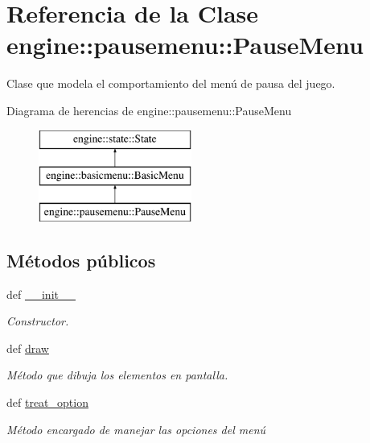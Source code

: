 \hypertarget{classengine_1_1pausemenu_1_1PauseMenu}{
\section{\-Referencia de la \-Clase engine\-:\-:pausemenu\-:\-:\-Pause\-Menu}
\label{classengine_1_1pausemenu_1_1PauseMenu}
}


\-Clase que modela el comportamiento del menú de pausa del juego.  


\-Diagrama de herencias de engine\-:\-:pausemenu\-:\-:\-Pause\-Menu\begin{figure}[H]
\begin{center}
\leavevmode
\includegraphics[height=3.000000cm]{classengine_1_1pausemenu_1_1PauseMenu}
\end{center}
\end{figure}
\subsection*{\-Métodos públicos}
\begin{DoxyCompactItemize}
\item 
def \hyperlink{classengine_1_1pausemenu_1_1PauseMenu_aa5d8354c5d017e26206ee973568ae0fb}{\-\_\-\-\_\-init\-\_\-\-\_\-}
\begin{DoxyCompactList}\small\item\em \-Constructor. \end{DoxyCompactList}\item 
def \hyperlink{classengine_1_1pausemenu_1_1PauseMenu_a84d5606933ae103b4377c108fdb62d79}{draw}
\begin{DoxyCompactList}\small\item\em \-Método que dibuja los elementos en pantalla. \end{DoxyCompactList}\item 
\hypertarget{classengine_1_1pausemenu_1_1PauseMenu_a416856d5e14b44e94aa7345fb7bbec5e}{
def \hyperlink{classengine_1_1pausemenu_1_1PauseMenu_a416856d5e14b44e94aa7345fb7bbec5e}{treat\-\_\-option}}
\label{classengine_1_1pausemenu_1_1PauseMenu_a416856d5e14b44e94aa7345fb7bbec5e}

\begin{DoxyCompactList}\small\item\em \-Método encargado de manejar las opciones del menú \end{DoxyCompactList}\end{DoxyCompactItemize}
